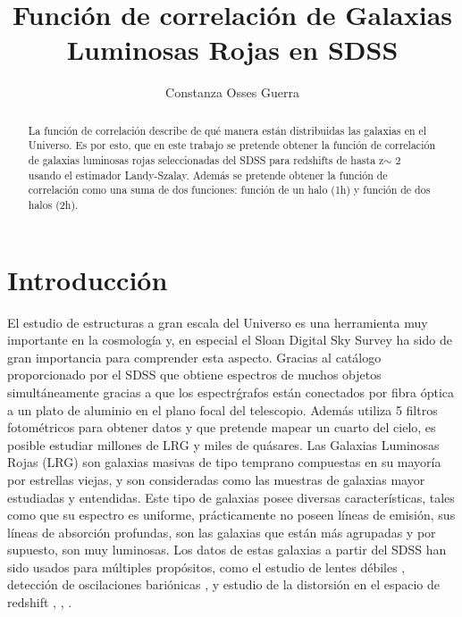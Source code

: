\documentclass[twocolumn,letterpaper,spanish]{revtex4}
\numberwithin{equation}{section}
\begin{document}
\title{Funci\'on de correlaci\'on de Galaxias Luminosas Rojas en SDSS}
\author{Constanza Osses Guerra}

\begin{abstract}
 La funci\'on de correlaci\'on describe de qu\'e manera est\'an distribuidas las galaxias en el Universo. Es por esto, que en este trabajo se pretende obtener la funci\'on de correlaci\'on de galaxias luminosas rojas seleccionadas del SDSS para redshifts de hasta z$\sim$ 2 usando el estimador Landy-Szalay. Adem\'as se pretende obtener la funci\'on de correlaci\'on como una suma de dos funciones: funci\'on de un halo (1h) y funci\'on de dos halos (2h).%
\end{abstract}


\maketitle

\section{Introducci\'on}

El estudio de estructuras a gran escala del Universo es una herramienta muy importante en la cosmolog\'ia y, en especial el Sloan Digital Sky Survey \cite{anderson} ha sido de gran importancia para comprender esta aspecto.
Gracias al cat\'alogo proporcionado por el SDSS que obtiene espectros de muchos objetos simult\'aneamente gracias a que los espectr\'grafos est\'an conectados por fibra \'optica a un plato de aluminio en el plano focal del telescopio. Adem\'as utiliza 5 filtros fotom\'etricos para obtener datos y que pretende mapear un cuarto del cielo, es posible estudiar millones de LRG y miles de qu\'asares.
Las Galaxias Luminosas Rojas (LRG) son galaxias masivas de tipo temprano compuestas en su mayor\'ia por estrellas viejas, y son consideradas como las muestras de galaxias mayor estudiadas y entendidas. Este tipo de galaxias posee diversas caracter\'isticas, tales como que su espectro es uniforme, pr\'acticamente no poseen l\'ineas de emisi\'on, sus l\'ineas de absorci\'on profundas, son las galaxias que est\'an m\'as agrupadas y por supuesto, son muy luminosas. Los datos de estas galaxias a partir del SDSS han sido usados para m\'ultiples prop\'ositos, como el estudio de lentes d\'ebiles \cite{mandelbaum}, detecci\'on de oscilaciones bari\'onicas \cite{Eisenstein2005}, \cite{kazin} y estudio de la distorsi\'on en el espacio de redshift \cite{cabre}, \cite{reid}, \cite{samushia}.
\end{document}
